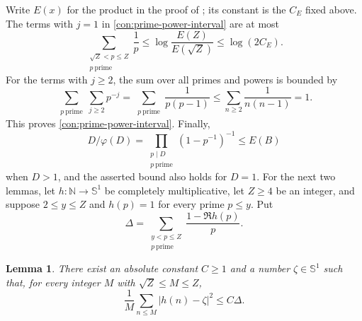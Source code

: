 \documentclass[twoside]{aomart}
\makeatletter
\theoremstyle{paperplain}
\newtheorem{lemma}[theorem]{Lemma}
\theoremstyle{paperdefinition}
\renewenvironment{proof}[1][\proofname]{\par\pushQED{\qed}%
  \normalfont\topsep6\p@\@plus3\p@\relax\trivlist
  \item[\hskip\labelsep\itshape #1\@addpunct{.}]\ignorespaces
}{\popQED\endtrivlist\@endpefalse}
\newcommand{\N}{\mathbb N}
\numberwithin{equation}{section}
\makeatother
\begin{document}
\begin{proof}
Write $E(x)$ for the product in the proof of
; its constant is the $C_E$ fixed above.
The terms with $j=1$ in \eqref{con:prime-power-interval} are at
most
\begin{equation*}
 \sum_{\substack{\sqrt Z<p\le Z\\p\ \mathrm{prime}}}\frac1p
 \le\log\frac{E(Z)}{E(\sqrt Z)}\le\log(2C_E).
\end{equation*}
For the terms with $j\ge2$, the sum over all primes and powers is
bounded by
\begin{equation*}
 \sum_{\substack{p\ \mathrm{prime}}}\sum_{j\ge2}p^{-j}
 =\sum_{\substack{p\ \mathrm{prime}}}\frac1{p(p-1)}
 \le\sum_{n\ge2}\frac1{n(n-1)}=1.
\end{equation*}
This proves \eqref{con:prime-power-interval}. Finally,
$$D/\varphi(D)=\prod_{\substack{p\mid D\\p\ \mathrm{prime}}}(1-p^{-1})^{-1}\le E(B)$$ when
$D>1$, and the asserted bound also holds for $D=1$.
\end{proof}
For the next two lemmas, let $h:\N\to\mathbb S^1$ be completely
multiplicative, let
$Z\ge4$ be an integer, and suppose $2\le y\le Z$ and $h(p)=1$
for every prime $p\le y$. Put
\begin{equation*}
 \Delta=\sum_{\substack{y<p\le Z\\p\ \mathrm{prime}}}\frac{1-\Re h(p)}p.
\end{equation*}

\begin{lemma}
\label{con:common-scalar}
There exist an absolute constant $C\ge1$ and a number $\zeta\in\mathbb S^1$ such that, for
every integer $M$ with $\sqrt Z\le M\le Z$,
\begin{equation}
 \frac1M\sum_{n\le M}|h(n)-\zeta|^2\le C\Delta.
 \label{con:prefix-concentration}
\end{equation}
\end{lemma}
\end{document}
